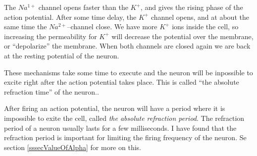 The $Na^{1+}$ channel opens faster than the $K^+$, and gives the rising phase of the action potential.
After some time delay, the $K^+$ channel opens, and at about the same time the $Na^{2+}$--channel close.
We have more $K^+$ ions inside the cell, so increasing the permeability for $K^+$ will decrease the potential over the membrane, or ``depolarize'' the membrane.
When both channels are closed again we are back at the resting potential of the neuron. %

These mechanisms take some time to execute and the neuron will be inpossible to excite right after the action potential takes place.
This is called ``the absolute refraction time'' of the neuron..


After firing an action potential, the neuron will have a period where it is impossible to exite the cell, called \emph{the absolute refraction period}. 
The refraction period of a neuron usually lasts for a few milliseconds.
I have found that the refraction period is important for limiting the firing frequency of the neuron. Se section \ref{sssecValueOfAlpha} for more on this.










